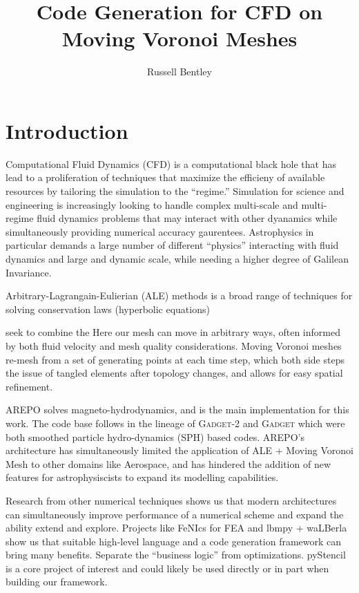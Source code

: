 \documentclass{article}
\title{Code Generation for CFD on Moving Voronoi Meshes}
\author{Russell Bentley}
\begin{document}
\twocolumn

\maketitle

\section{Introduction}

Computational Fluid Dynamics (CFD) is a computational black hole
that has lead to a proliferation of techniques that maximize the 
efficieny of available resources by tailoring the simulation to the ``regime.''
Simulation for science and engineering is 
increasingly looking to handle complex multi-scale and multi-regime 
fluid dynamics problems that may interact with other dyanamics while 
simultaneously providing numerical accuracy gaurentees.
Astrophysics in particular demands a large number of different ``physics'' 
interacting with fluid dynamics and large and dynamic scale, 
while needing a higher degree of Galilean Invariance.

Arbitrary-Lagrangain-Eulierian (ALE) methods 
is a broad range of techniques for solving conservation laws
(hyperbolic equations)



seek to combine
the 
Here our mesh can move in arbitrary ways, often informed by both fluid velocity and
mesh quality considerations.
Moving Voronoi meshes re-mesh from a set of generating points at each time step,
which both
side steps the issue of tangled elements after topology changes,
and allows for easy spatial refinement.

AREPO solves magneto-hydrodynamics, and is the main implementation for this work.
The code base follows in the lineage of \textsc{Gadget-2} and \textsc{Gadget} which 
were both smoothed particle hydro-dynamics (SPH) based codes.
AREPO's architecture has simultaneously limited the application of ALE + Moving Voronoi Mesh
to other domains like Aerospace, and has hindered the addition of new features for astrophysiscists 
to expand its modelling capabilities.


Research from other numerical techniques shows us that modern architectures can simultaneously
improve performance of a numerical scheme and expand the ability extend and explore.
Projects like FeNIcs for FEA and lbmpy + waLBerla show us that suitable high-level language and a code generation 
framework can bring many benefits.
Separate the ``business logic'' from optimizations.
pyStencil is a core project of interest and could likely be used directly or in part when 
building our framework.
\end{document}
